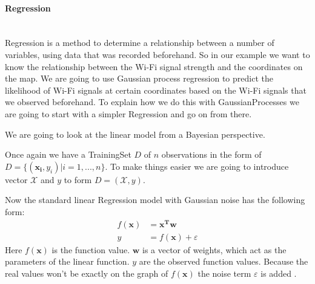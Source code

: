\paragraph{Regression}\mbox{}\\
\Gls{Regression} is a method to determine a relationship between a number of variables, using data that was recorded beforehand. So in our example we want to know the relationship between the Wi-Fi signal strength and the coordinates on the map. 
We are going to use Gaussian process regression to predict the likelihood of Wi-Fi signals at certain coordinates based on the Wi-Fi signals that we observed beforehand. To explain how we do this with \Gls{GaussianProcess}es we are going to start with a simpler \gls{Regression} and go on from there. 

We are going to look at the linear model from a Bayesian perspective. 

Once again we have a \gls{TrainingSet} $D$ of $n$ observations in the form of $D = \{(\mathbf{x_i},y_i)|i=1,...,n\}$. To make things easier we are going to introduce vector $\mathcal{X}$ and $y$ to form $D = (\mathcal{X},y)$.

Now the standard linear \gls{Regression} model with Gaussian noise has the following form:
\begin{equation}\label{linearmodel}
\begin{aligned}
f(\mathbf{x}) &= \mathbf{x^T}\mathbf{w}\\
y &= f(\mathbf{x}) + \varepsilon
\end{aligned}
\end{equation}
Here $f(\mathbf{x})$ is the function value. $\mathbf{w}$ is a vector of weights, which act as the parameters of the linear function. $y$ are the observed function values. Because the real values won't be exactly on the graph of $f(\mathbf{x})$ the noise term $\varepsilon$ is added \citep[p.\ 8]{Rasmussen:2005:GPM:1162254}. 

